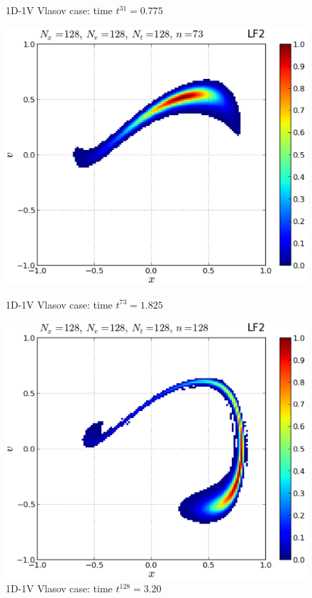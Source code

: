 \documentclass[11pt,titlepage]{report}
\begin{document}
\begin{figure}[h!]
\begin{minipage}[b]{0.5\linewidth}
\caption{1D-1V Vlasov case: time $t^{31} = 0.775$}
\vspace{4ex}
\end{minipage} 
\begin{minipage}[b]{0.5\linewidth}
\centering
\includegraphics[width=\linewidth]{graphics/plot_-_1DVP_F12_Nx128Nv128Nt128_it00073}
\caption{1D-1V Vlasov case: time $t^{73} = 1.825$}
\vspace{4ex}
\end{minipage}%
\begin{minipage}[b]{0.5\linewidth}
\centering
\includegraphics[width=\linewidth]{graphics/plot_-_1DVP_F12_Nx128Nv128Nt128_it00128}
\caption{1D-1V Vlasov case: time $t^{128} = 3.20$}
\vspace{4ex}
\end{minipage} 
\end{figure}
\end{document}
